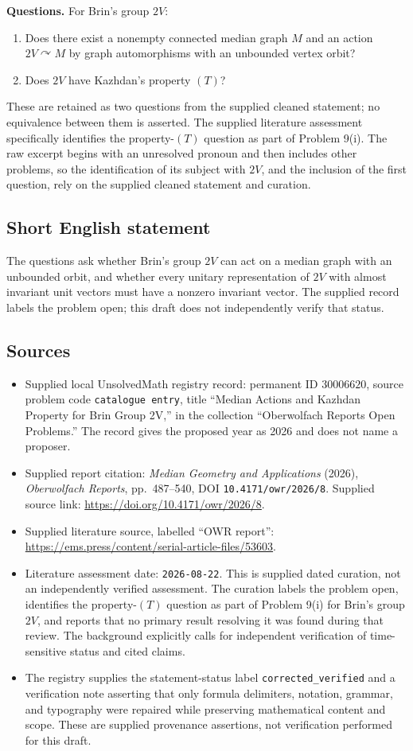 \documentclass[11pt]{article}
\begin{document}
\textbf{Questions.} For Brin's group \(2V\):
\begin{enumerate}
\item Does there exist a nonempty connected median graph \(M\) and an action \(2V\curvearrowright M\) by graph automorphisms with an unbounded vertex orbit?
\item Does \(2V\) have Kazhdan's property \((T)\)?
\end{enumerate}
These are retained as two questions from the supplied cleaned statement; no equivalence between them is asserted. The supplied literature assessment specifically identifies the property-\((T)\) question as part of Problem 9(i). The raw excerpt begins with an unresolved pronoun and then includes other problems, so the identification of its subject with \(2V\), and the inclusion of the first question, rely on the supplied cleaned statement and curation.
\subsection{Short English statement}
The questions ask whether Brin's group \(2V\) can act on a median graph with an unbounded orbit, and whether every unitary representation of \(2V\) with almost invariant unit vectors must have a nonzero invariant vector. The supplied record labels the problem open; this draft does not independently verify that status.
\subsection{Sources}
\begin{itemize}
\item Supplied local UnsolvedMath registry record: permanent ID \(30006620\), source problem code \texttt{catalogue entry}, title ``Median Actions and Kazhdan Property for Brin Group 2V,'' in the collection ``Oberwolfach Reports Open Problems.'' The record gives the proposed year as 2026 and does not name a proposer.
\item Supplied report citation: \emph{Median Geometry and Applications} (2026), \emph{Oberwolfach Reports}, pp.~487--540, DOI \texttt{10.4171/owr/2026/8}. Supplied source link: \url{https://doi.org/10.4171/owr/2026/8}.
\item Supplied literature source, labelled ``OWR report'': \url{https://ems.press/content/serial-article-files/53603}.
\item Literature assessment date: \texttt{2026-08-22}. This is supplied dated curation, not an independently verified assessment. The curation labels the problem open, identifies the property-\((T)\) question as part of Problem 9(i) for Brin's group \(2V\), and reports that no primary result resolving it was found during that review. The background explicitly calls for independent verification of time-sensitive status and cited claims.
\item The registry supplies the statement-status label \texttt{corrected\_verified} and a verification note asserting that only formula delimiters, notation, grammar, and typography were repaired while preserving mathematical content and scope. These are supplied provenance assertions, not verification performed for this draft.
\end{itemize}
\end{document}

